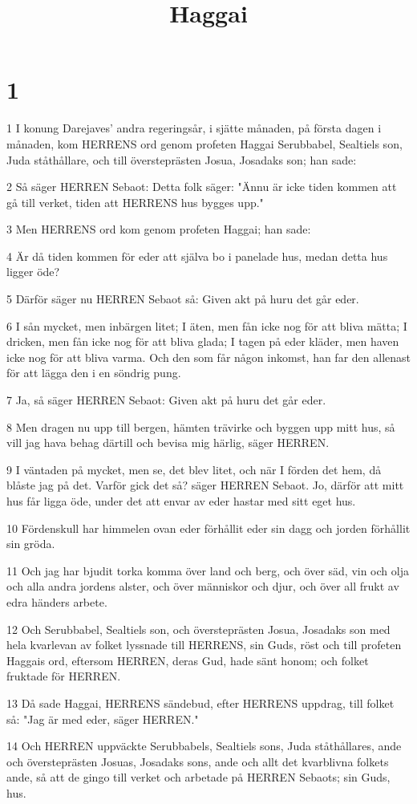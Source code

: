 

\title{Haggai}


\chapter{1}

\par 1 I konung Darejaves' andra regeringsår, i sjätte månaden, på första dagen i månaden, kom HERRENS ord genom profeten Haggai Serubbabel, Sealtiels son, Juda ståthållare, och till översteprästen Josua, Josadaks son; han sade:
\par 2 Så säger HERREN Sebaot: Detta folk säger: "Ännu är icke tiden kommen att gå till verket, tiden att HERRENS hus bygges upp."
\par 3 Men HERRENS ord kom genom profeten Haggai; han sade:
\par 4 Är då tiden kommen för eder att själva bo i panelade hus, medan detta hus ligger öde?
\par 5 Därför säger nu HERREN Sebaot så: Given akt på huru det går eder.
\par 6 I sån mycket, men inbärgen litet; I äten, men fån icke nog för att bliva mätta; I dricken, men fån icke nog för att bliva glada; I tagen på eder kläder, men haven icke nog för att bliva varma. Och den som får någon inkomst, han far den allenast för att lägga den i en söndrig pung.
\par 7 Ja, så säger HERREN Sebaot: Given akt på huru det går eder.
\par 8 Men dragen nu upp till bergen, hämten trävirke och byggen upp mitt hus, så vill jag hava behag därtill och bevisa mig härlig, säger HERREN.
\par 9 I väntaden på mycket, men se, det blev litet, och när I förden det hem, då blåste jag på det. Varför gick det så? säger HERREN Sebaot. Jo, därför att mitt hus får ligga öde, under det att envar av eder hastar med sitt eget hus.
\par 10 Fördenskull har himmelen ovan eder förhållit eder sin dagg och jorden förhållit sin gröda.
\par 11 Och jag har bjudit torka komma över land och berg, och över säd, vin och olja och alla andra jordens alster, och över människor och djur, och över all frukt av edra händers arbete.
\par 12 Och Serubbabel, Sealtiels son, och översteprästen Josua, Josadaks son med hela kvarlevan av folket lyssnade till HERRENS, sin Guds, röst och till profeten Haggais ord, eftersom HERREN, deras Gud, hade sänt honom; och folket fruktade för HERREN.
\par 13 Då sade Haggai, HERRENS sändebud, efter HERRENS uppdrag, till folket så: "Jag är med eder, säger HERREN."
\par 14 Och HERREN uppväckte Serubbabels, Sealtiels sons, Juda ståthållares, ande och översteprästen Josuas, Josadaks sons, ande och allt det kvarblivna folkets ande, så att de gingo till verket och arbetade på HERREN Sebaots; sin Guds, hus.

